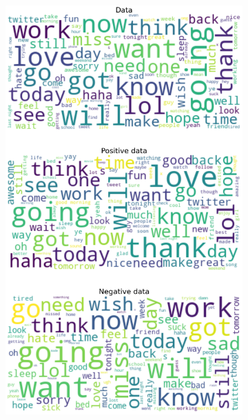 \documentclass{article}
\begin{document}
\begin{itemize}
\begin{figure}[H]
\begin{subfigure}[b]{0.24\textwidth}
      \includegraphics[width=\textwidth]{chapter-06/section-01-01/13/visualization/2/wordcloud.png}
    \end{subfigure}
    \begin{subfigure}[b]{0.24\textwidth}
      \centering

\end{subfigure}
\end{figure}
\end{itemize}
\end{document}
